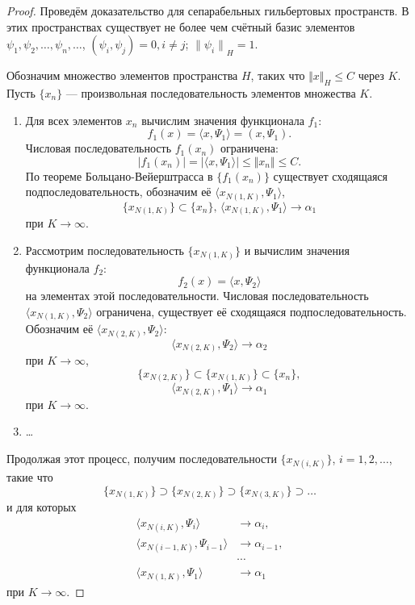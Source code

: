 \documentclass[12pt,a4paper,titlepage,oneside]{book}
\theoremstyle{definition}
\theoremstyle{plain}
\theoremstyle{break}
\theoremstyle{remark}
\theoremstyle{remark}
\theoremstyle{remark}
\theoremstyle{remark}
\theoremstyle{plain}
\theoremstyle{plain}
\begin{document}
\begin{proof}
Проведём доказательство для сепарабельных гильбертовых пространств. В этих пространствах существует не более чем счётный базис элементов $\psi_1, \psi_2, \ldots, \psi_n, \ldots$, $(\psi_i, \psi_j)=0, i\neq j$; ${\lVert \psi_i \rVert}_H=1$.

Обозначим множество элементов пространства $H$, таких что ${\Vert x \Vert} _H \leqslant C$ через $K$. Пусть $\lbrace x_n \rbrace$ --- произвольная последовательность элементов множества $K$.

\begin{enumerate}
\item Для всех элементов $x_n$ вычислим значения функционала $f_1$:
$$f_1(x)= \langle x,\Psi_1 \rangle =(x,\Psi_1).$$
Числовая последовательность $f_1(x_n)$ ограничена:
$$\vert f_1(x_n)\vert = \vert \langle x,\Psi_1 \rangle \vert \leqslant \Vert x_n\Vert \leqslant C.$$
По теореме Больцано-Вейерштрасса в $\lbrace f_1(x_n) \rbrace$ существует сходящаяся подпоследовательность, обозначим её 
$ \langle x_{N(1,K)},\Psi_1 \rangle $,
$$\lbrace x_{N(1,K)} \rbrace \subset
 \lbrace x_n \rbrace \mbox{, } \langle x_{N(1,K)},\Psi_1 \rangle  \to \alpha_1$$ 
при $K\to\infty$.

\item Рассмотрим последовательность $\lbrace x_{N(1,K)} \rbrace$ и вычислим значения функционала $f_2$:
$$f_2(x)= \langle x,\Psi_2 \rangle $$
на элементах этой последовательности. Числовая последовательность $  \langle  x_{N(1,K)},\Psi_2 \rangle $ ограничена, существует её сходящаяся подпоследовательность. Обозначим её 
$\langle x_{N(2,K)},\Psi_2 \rangle $:
$$\langle x_{N(2,K)},\Psi_2 \rangle  \to \alpha_2$$
при $K\to\infty$, 
$$\lbrace x_{N(2,K)} \rbrace \subset \lbrace x_{N(1,K)} \rbrace \subset \lbrace x_n \rbrace,$$
$$\langle x_{N(2,K)},\Psi_1 \rangle  \to \alpha_1$$
при $K\to\infty$.

\item \ldots
\end{enumerate}

Продолжая этот процесс, получим последовательности 
$\lbrace x_{N(i,K)} \rbrace$, $i=1,2,\ldots$, такие что 
$$\lbrace x_{N(1,K)} \rbrace \supset \lbrace x_{N(2,K)} \rbrace \supset \lbrace x_{N(3,K)} \rbrace \supset \ldots$$
и для которых
\begin{align*}
\langle x_{N(i,K)},\Psi_i \rangle &\to \alpha_i,\\
\langle x_{N(i-1,K)},\Psi_{i-1} \rangle &\to \alpha_{i-1},\\
&\cdots\\
\langle x_{N(1,K)},\Psi_{1} \rangle &\to \alpha_{1}
\end{align*}
при $K \to \infty$.


\end{proof}
\end{document}
